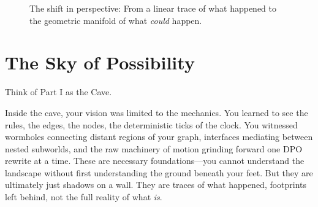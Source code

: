 \begin{figure}[h]
    \centering
    \caption{The shift in perspective: From a linear trace of what happened to the geometric manifold of what \emph{could} happen.}
    \label{fig:cave_vs_landscape}
\end{figure}

\section*{The Sky of Possibility}

Think of Part I as the Cave.

Inside the cave, your vision was limited to the mechanics. You learned to see the rules, the edges, the nodes, the deterministic ticks of the clock. You witnessed wormholes connecting distant regions of your graph, interfaces mediating between nested subworlds, and the raw machinery of motion grinding forward one DPO rewrite at a time. These are necessary foundations---you cannot understand the landscape without first understanding the ground beneath your feet. But they are ultimately just shadows on a wall. They are traces of what happened, footprints left behind, not the full reality of what \emph{is}.

